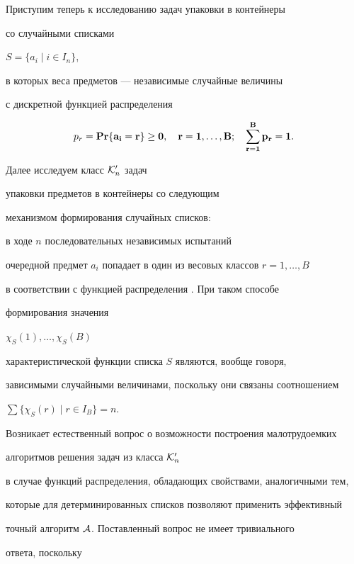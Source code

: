 Приступим теперь к исследованию задач упаковки в контейнеры


со случайными списками


$S=\{ a_{i}\mid i\in I_{n} \}$,


в которых веса предметов --- независимые случайные величины


с дискретной функцией распределения


\begin{equation}


\label{e6}


p_{r}=\PR \{a_i=r\} \ge 0,\quad r=1,\dotsc ,B;\quad


\sum_{r=1}^{B}p_{r}=1.


\end {equation}





Далее исследуем класс ${\cal K}_n'$ задач


упаковки предметов в контейнеры со следующим


механизмом формирования случайных списков:


в ходе $n$ последовательных независимых испытаний


очередной предмет $a_i$ попадает в один из весовых классов $r=1,\dotsc,B$


в соответствии с функцией распределения . При таком способе


формирования значения


$\chi_S(1),\dotsc,\chi_S(B)$


характеристической функции списка $S$ являются, вообще говоря,


зависимыми случайными величинами, поскольку они связаны соотношением


$\sum \{\chi_S(r)\mid r\in I_{B} \} =n$.





Возникает естественный вопрос о возможности построения малотрудоемких


алгоритмов решения задач из класса ${\cal K}_n'$


в случае функций распределения, обладающих свойствами, аналогичными тем,


которые для детерминированных списков позволяют применить эффективный


точный алгоритм ${\cal A}$. Поставленный вопрос не имеет тривиального


ответа, поскольку


